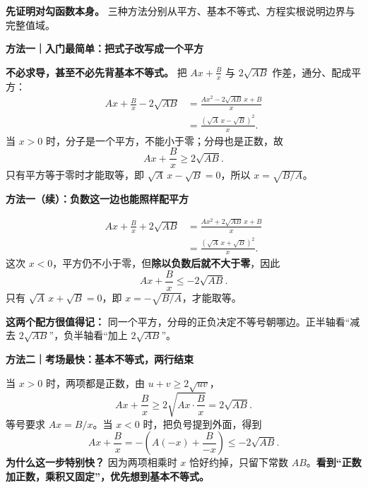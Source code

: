 \clearpage
\begin{proofbox}
\textbf{先证明对勾函数本身。} 三种方法分别从平方、基本不等式、方程实根说明边界与完整值域。

\medskip
\textbf{方法一｜入门最简单：把式子改写成一个平方}



\textbf{不必求导，甚至不必先背基本不等式。} 把 $Ax+\frac Bx$ 与 $2\sqrt{AB}$ 作差，通分、配成平方：
\[
\begin{aligned}
Ax+\frac Bx-2\sqrt{AB}
&=\frac{Ax^2-2\sqrt{AB}\,x+B}{x}\\
&=\frac{(\sqrt A\,x-\sqrt B)^2}{x}.
\end{aligned}
\]
当 $x>0$ 时，分子是一个平方，不能小于零；分母也是正数，故
\[
\boxed{Ax+\frac Bx\ge2\sqrt{AB}}.
\]
只有平方等于零时才能取等，即 $\sqrt A\,x-\sqrt B=0$，所以 $x=\sqrt{B/A}$。

\end{proofbox}
\clearpage
\begin{proofbox}
\textbf{方法一（续）：负数这一边也能照样配平方}

\[
\begin{aligned}
Ax+\frac Bx+2\sqrt{AB}
&=\frac{Ax^2+2\sqrt{AB}\,x+B}{x}\\
&=\frac{(\sqrt A\,x+\sqrt B)^2}{x}.
\end{aligned}
\]
这次 $x<0$，平方仍不小于零，但\textbf{除以负数后就不大于零}，因此
\[
\boxed{Ax+\frac Bx\le-2\sqrt{AB}}.
\]
只有 $\sqrt A\,x+\sqrt B=0$，即 $x=-\sqrt{B/A}$，才能取等。

\textbf{这两个配方很值得记：} 同一个平方，分母的正负决定不等号朝哪边。正半轴看“减去 $2\sqrt{AB}$”，负半轴看“加上 $2\sqrt{AB}$”。

\medskip
\end{proofbox}
\clearpage
\begin{proofbox}
\textbf{方法二｜考场最快：基本不等式，两行结束}



当 $x>0$ 时，两项都是正数，由 $u+v\ge2\sqrt{uv}$，
\[
Ax+\frac Bx\ge2\sqrt{Ax\cdot\frac Bx}=2\sqrt{AB}.
\]
等号要求 $Ax=B/x$。当 $x<0$ 时，把负号提到外面，得到
\[
Ax+\frac Bx=-\left(A(-x)+\frac B{-x}\right)\le-2\sqrt{AB}.
\]
\textbf{为什么这一步特别快？} 因为两项相乘时 $x$ 恰好约掉，只留下常数 $AB$。\textbf{看到“正数加正数，乘积又固定”，优先想到基本不等式。}

\medskip
\end{proofbox}
\clearpage
